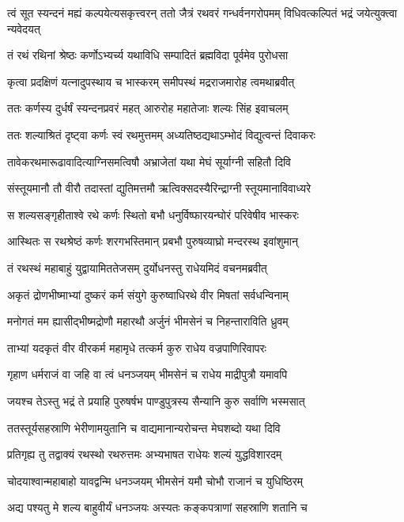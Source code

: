 त्वं सूत स्यन्दनं मह्यं कल्पयेत्यसकृत्त्वरन्
\twolineshloka
{ततो जैत्रं रथवरं गन्धर्वनगरोपमम्}
{विधिवत्कल्पितं भद्रं जयेत्युक्त्वा न्यवेदयत्}


\twolineshloka
{तं रथं रथिनां श्रेष्ठः कर्णोऽभ्यर्च्य यथाविधि}
{सम्पादितं ब्रह्मविदा पूर्वमेव पुरोधसा}


\twolineshloka
{कृत्वा प्रदक्षिणं यत्नादुपस्थाय च भास्करम्}
{समीपस्थं मद्रराजमारोह त्वमथाब्रवीत्}


\twolineshloka
{ततः कर्णस्य दुर्धर्षं स्यन्दनप्रवरं महत्}
{आरुरोह महातेजाः शल्यः सिंह इवाचलम्}


\twolineshloka
{ततः शल्याश्रितं दृष्ट्वा कर्णः स्वं रथमुत्तमम्}
{अध्यतिष्ठद्यथाऽम्भोदं विद्युत्वन्तं दिवाकरः}


\twolineshloka
{तावेकरथमारूढावादित्याग्निसमत्विषौ}
{अभ्राजेतां यथा मेघं सूर्याग्नी सहितौ दिवि}


\twolineshloka
{संस्तूयमानौ तौ वीरौ तदास्तां द्युतिमत्तमौ}
{ऋत्विक्सदस्यैरिन्द्राग्नी स्तूयमानाविवाध्यरे}


\twolineshloka
{स शल्यसङ्गृहीताश्वे रथे कर्णः स्थितो बभौ}
{धनुर्विष्फारयन्घोरं परिवेषीव भास्करः}


\twolineshloka
{आस्थितः स रथश्रेष्ठं कर्णः शरगभस्तिमान्}
{प्रबभौ पुरुषव्याघ्रो मन्दरस्थ इवांशुमान्}


\twolineshloka
{तं रथस्थं महाबाहुं युद्वायामिततेजसम्}
{दुर्योधनस्तु राधेयमिदं वचनमब्रवीत्}


\twolineshloka
{अकृतं द्रोणभीष्माभ्यां दुष्करं कर्म संयुगे}
{कुरुष्वाधिरथे वीर मिषतां सर्वधन्विनाम्}


\twolineshloka
{मनोगतं मम ह्यासीद्भीष्मद्रोणौ महारथौ}
{अर्जुनं भीमसेनं च निहन्ताराविति ध्रुवम्}


\twolineshloka
{ताभ्यां यदकृतं वीर वीरकर्म महामृधे}
{तत्कर्म कुरु राधेय वज्रपाणिरिवापरः}


\twolineshloka
{गृहाण धर्मराजं वा जहि वा त्वं धनञ्जयम्}
{भीमसेनं च राधेय माद्रीपुत्रौ यमावपि}


\twolineshloka
{जयश्च तेऽस्तु भद्रं ते प्रयाहि पुरुषर्षभ}
{पाण्डुपुत्रस्य सैन्यानि कुरु सर्वाणि भस्मसात्}


\twolineshloka
{ततस्तूर्यसहस्राणि भेरीणामयुतानि च}
{वाद्यमानान्यरोचन्त मेघशब्दो यथा दिवि}


\twolineshloka
{प्रतिगृह्य तु तद्वाक्यं रथस्थो रथरुत्तमः}
{अभ्यभाषत राधेयः शल्यं युद्धविशारदम्}


\twolineshloka
{चोदयाश्वान्महाबाहो यावद्वन्मि धनञ्जयम्}
{भीमसेनं यमौ चोभौ राजानं च युधिष्ठिरम्}


\twolineshloka
{अद्य पश्यतु मे शल्य बाहुवीर्यं धनञ्जयः}
{अस्यतः कङ्कपत्राणां सहस्राणि शतानि च}


